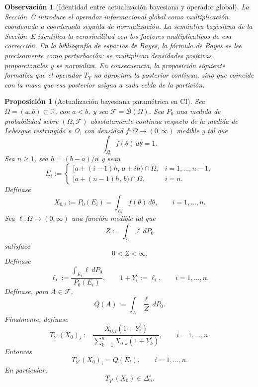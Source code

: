 ﻿\documentclass[12pt]{article}
\newtheorem{proposicion}{Proposición}[section]
\newtheorem{observacion}{Observación}[section]
\begin{document}
\begin{observacion}[Identidad entre actualización bayesiana y operador global]
La Sección~C introduce el operador informacional global como multiplicación coordenada a coordenada seguida de normalización. La semántica bayesiana de la Sección~E identifica la verosimilitud con los factores multiplicativos de esa corrección. En la bibliografía de espacios de Bayes, la fórmula de Bayes se lee precisamente como perturbación: se multiplican densidades positivas proporcionales y se normaliza. En consecuencia, la proposición siguiente formaliza que el operador $T_Y$ no aproxima la posterior continua, sino que coincide con la masa que esa posterior asigna a cada celda de la partición.
\end{observacion}

\begin{proposicion}[Actualización bayesiana paramétrica en CI]\label{prop:bayes_parametrico}
Sea $\Omega=(a,b)\subset\mathbb R$, con $a<b$, y sea $\mathcal F=\mathcal B(\Omega)$. Sea $P_0$ una medida de probabilidad sobre $(\Omega,\mathcal F)$ absolutamente continua respecto de la medida de Lebesgue restringida a $\Omega$, con densidad $f:\Omega\to(0,\infty)$ medible y tal que
\[
\int_\Omega f(\theta)\,d\theta=1.
\]
Sea $n\ge 1$, sea $h=(b-a)/n$ y sean
\[
E_i:=
\begin{cases}
[a+(i-1)h,\,a+ih)\cap\Omega, & i=1,\dots,n-1,\\[4pt]
[a+(n-1)h,\,b)\cap\Omega, & i=n.
\end{cases}
\]
Defínase
\[
X_{0,i}:=P_0(E_i)=\int_{E_i}f(\theta)\,d\theta,
\qquad i=1,\dots,n.
\]
Sea $\ell:\Omega\to(0,\infty)$ una función medible tal que
\[
Z:=\int_\Omega\ell\,dP_0
\]
satisface
\[
0<Z<\infty.
\]
Defínase
\[
\ell_i:=\frac{\displaystyle\int_{E_i}\ell\,dP_0}{P_0(E_i)},
\qquad
1+Y_i^\ell:=\ell_i,
\qquad i=1,\dots,n.
\]
Defínase, para $A\in\mathcal F$,
\[
Q(A):=\int_A\frac{\ell}{Z}\,dP_0.
\]
Finalmente, defínase
\[
T_{Y^\ell}(X_0)_i
:=
\frac{X_{0,i}(1+Y_i^\ell)}{\displaystyle\sum_{k=1}^nX_{0,k}(1+Y_k^\ell)},
\qquad i=1,\dots,n.
\]
Entonces
\[
T_{Y^\ell}(X_0)_i=Q(E_i),
\qquad i=1,\dots,n.
\]
En particular,
\[
T_{Y^\ell}(X_0)\in\Delta_n^\circ.
\]
\end{proposicion}
\end{document}
